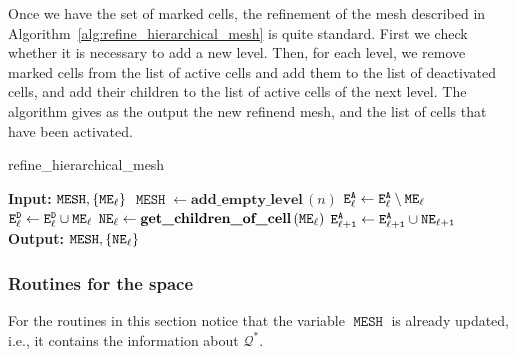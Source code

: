 \documentclass[a4paper]{siamltex1213}
\newcommand{\activeelements}[1]{\tt E^A_{#1}}
\newcommand{\deactelements}[1]{\tt E^D_{#1}}
\DeclareMathOperator\mesh{\texttt{MESH}}
\DeclareMathOperator\newcells{\tt NE}
\DeclareMathOperator\markedelements{\tt ME}
\newcommand\QQ{\mathcal Q}
\begin{document}
Once we have the set of marked cells, the refinement of the mesh described in Algorithm~\ref{alg:refine_hierarchical_mesh} is quite standard. First we check whether it is necessary to add a new level. Then, for each level, we remove marked cells from the list of active cells and add them to the list of deactivated cells, and add their children to the list of active cells of the next level. The algorithm gives as the output the new refinend mesh, and the list of cells that have been activated.

\begin{algorithm}
\caption{refine\_hierarchical\_mesh} \label{alg:refine_hierarchical_mesh}
\begin{algorithmic}[1]
\Statex \textbf{Input:} $\mesh, \{\markedelements_\ell\}$
\If {$\markedelements_{n-1} \not = \emptyset$} 
\State $\mesh \gets \textbf{add\_empty\_level} \, (n)$
\EndIf
{}
\State $\activeelements{\ell} \gets \activeelements{\ell} \setminus \markedelements_\ell$
\State $\deactelements{\ell} \gets \deactelements{\ell} \cup \markedelements_\ell$
\State $\newcells_\ell \gets \textbf{get\_children\_of\_cell} \, (\markedelements_\ell)$
\State $\activeelements{\ell+1} \gets \activeelements{\ell+1} \cup \newcells_{\ell+1}$
\EndFor
\Statex \textbf{Output:} $\mesh, \{\newcells_\ell\}$
\end{algorithmic}
\end{algorithm}


\subsubsection{Routines for the space}




For the routines in this section notice that the variable $\mesh$ is already updated, i.e., it contains the information about $\QQ^*$.
\end{document}
